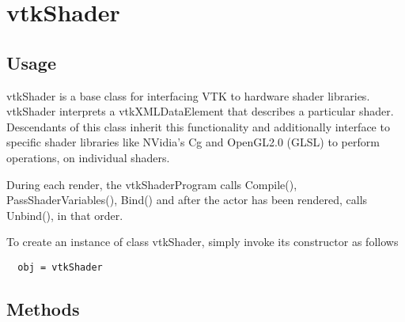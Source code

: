 \section{vtkShader}

\subsection{Usage}

 vtkShader is a base class for interfacing VTK to hardware shader
 libraries. vtkShader interprets a vtkXMLDataElement that describes a
 particular shader. Descendants of this class inherit this functionality and
 additionally interface to specific shader libraries like NVidia's Cg and
 OpenGL2.0 (GLSL) to perform operations, on individual shaders.
 
 During each render, the vtkShaderProgram calls Compile(),
 PassShaderVariables(), Bind() and after the actor has been rendered,
 calls Unbind(), in that order.

To create an instance of class vtkShader, simply
invoke its constructor as follows
\begin{verbatim}
  obj = vtkShader
\end{verbatim}
\subsection{Methods}

